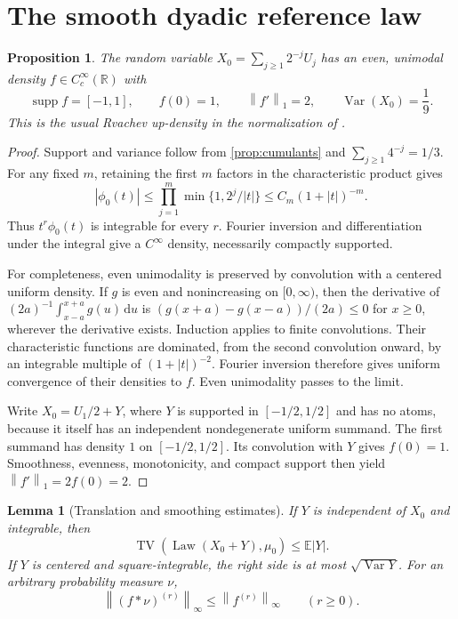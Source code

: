 \documentclass[11pt,a4paper]{article}
\newtheorem{proposition}[theorem]{Proposition}
\newtheorem{lemma}[theorem]{Lemma}
\theoremstyle{definition}
\theoremstyle{remark}
\DeclareMathOperator{\TV}{TV}
\DeclareMathOperator{\Law}{Law}
\DeclareMathOperator{\Var}{Var}
\DeclareMathOperator{\supp}{supp}
\newcommand{\R}{\mathbb R}
\newcommand{\E}{\mathbb E}
\newcommand{\dd}{\,\mathrm d}
\newcommand{\norm}[1]{\left\lVert #1\right\rVert}
\begin{document}
\section{The smooth dyadic reference law}
\label{sec:fabius}

\begin{proposition}\label{prop:base}
The random variable $X_0=\sum_{j\ge1}2^{-j}U_j$ has an even, unimodal
density $f\in C_c^\infty(\R)$ with
\[
 \supp f=[-1,1],\qquad f(0)=1,\qquad
 \norm{f'}_1=2,\qquad \Var(X_0)=\frac19.
\]
This is the usual Rvachev up-density in the normalization of
\cite{AriasDefinition}.
\end{proposition}

\begin{proof}
Support and variance follow from \cref{prop:cumulants} and
$\sum_{j\ge1}4^{-j}=1/3$. For any fixed $m$, retaining the first $m$
factors in the characteristic product gives
\[
 |\phi_0(t)|\le \prod_{j=1}^m\min\{1,2^j/|t|\}
               \le C_m(1+|t|)^{-m}.
\]
Thus $t^r\phi_0(t)$ is integrable for every $r$. Fourier inversion and
differentiation under the integral give a $C^\infty$ density, necessarily
compactly supported.

For completeness, even unimodality is preserved by convolution with a
centered uniform density. If $g$ is even and nonincreasing on $[0,\infty)$,
then the derivative of $(2a)^{-1}\int_{x-a}^{x+a}g(u)\dd u$ is
$(g(x+a)-g(x-a))/(2a)\le0$ for $x\ge0$, wherever the derivative exists.
Induction applies to finite convolutions. Their characteristic functions
are dominated, from the second convolution onward, by an integrable
multiple of $(1+|t|)^{-2}$. Fourier inversion therefore gives uniform
convergence of their densities to $f$. Even unimodality passes to the limit.

Write $X_0=U_1/2+Y$, where $Y$ is supported in $[-1/2,1/2]$ and has no
atoms, because it itself has an independent nondegenerate uniform summand.
The first summand has density $1$ on $[-1/2,1/2]$. Its convolution with
$Y$ gives $f(0)=1$. Smoothness, evenness, monotonicity, and compact support
then yield $\norm{f'}_1=2f(0)=2$.
\end{proof}

\begin{lemma}[Translation and smoothing estimates]\label{lem:smoothing}
If $Y$ is independent of $X_0$ and integrable, then
\begin{equation}\label{eq:translation}
 \TV(\Law(X_0+Y),\mu_0)\le \E|Y|.
\end{equation}
If $Y$ is centered and square-integrable, the right side is at most
$\sqrt{\Var Y}$. For an arbitrary probability measure $\nu$,
\begin{equation}\label{eq:smooth-bound}
 \norm{(f*\nu)^{(r)}}_\infty\le\norm{f^{(r)}}_\infty
            \qquad(r\ge0).
\end{equation}
\end{lemma}
\end{document}
